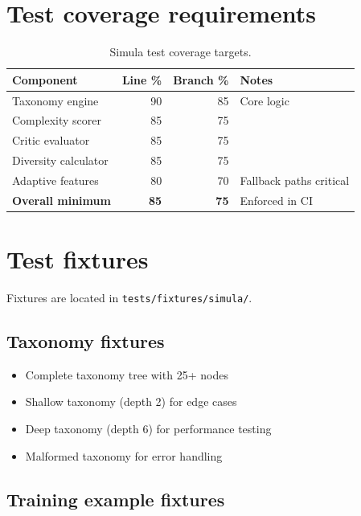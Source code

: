 \documentclass[12pt,a4paper,twoside]{report}
\begin{document}
\section{Test coverage requirements}

\begin{table}[htbp]
\centering
\caption{Simula test coverage targets.}
\label{tab:simula-coverage}
\footnotesize
\begin{tabularx}{\linewidth}{@{}l r r X@{}}
\toprule
\textbf{Component} & \textbf{Line \%} & \textbf{Branch \%} & \textbf{Notes} \\ \midrule
Taxonomy engine & 90 & 85 & Core logic \\
Complexity scorer & 85 & 75 & \\
Critic evaluator & 85 & 75 & \\
Diversity calculator & 85 & 75 & \\
Adaptive features & 80 & 70 & Fallback paths critical \\
\textbf{Overall minimum} & \textbf{85} & \textbf{75} & Enforced in CI \\
\bottomrule
\end{tabularx}
\end{table}

\section{Test fixtures}

Fixtures are located in \texttt{tests/fixtures/simula/}.

\subsection{Taxonomy fixtures}

\begin{itemize}
\item Complete taxonomy tree with 25+ nodes
\item Shallow taxonomy (depth 2) for edge cases
\item Deep taxonomy (depth 6) for performance testing
\item Malformed taxonomy for error handling
\end{itemize}

\subsection{Training example fixtures}
\end{document}
